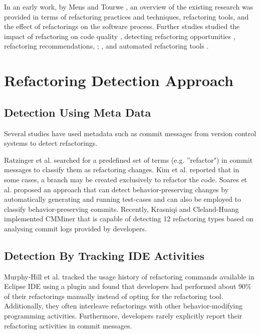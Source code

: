 \documentclass[letterpaper,12pt,onecolumn,final]{report}
\begin{document}
In an early work, by Mens and Tourwe \cite{Mens2004}, an overview of the existing research was provided in terms of refactoring practices and techniques, refactoring tools, and the effect of refactorings on the software process. Further studies studied the impact of refactoring on code quality \cite{Moser2006} \cite{wilking2007empirical} \cite{bavota2015experimental} \cite{cedrim2016does} \cite{pantiuchina2018improving} \cite{alomar2019impact},  detecting refactoring opportunities \cite{fontana2012automatic} \cite{palomba2013detecting}, refactoring recommendations, \cite{mkaouer2015many}; \cite{bavota2014recommending} \cite{ouni2016multi}, and automated refactoring tools \cite{roberts1997refactoring} \cite{mazinanian2016jdeodorant} \cite{Kim2010} \cite{Tsantalis2018} \cite{Silva2020} \cite{Moghadam2021}.

\section{Refactoring Detection Approach}
\subsection{Detection Using Meta Data}
Several studies have used metadata such as commit messages from version control systems to detect refactorings. 

Ratzinger et al. \cite{ratzinger2008relation} searched for a predefined set of terms (e.g. ”refactor") in commit messages to classify them as refactoring changes. Kim et al. \cite{kim2014empirical} reported that in some cases, a branch may be created exclusively to refactor the code. Soares et al. \cite{soares2010making} proposed an approach that can detect behavior-preserving changes by automatically generating and running test-cases and can also be employed to classify behavior-preserving commits. Recently, Krasniqi and Cleland-Huang \cite{Krasniqi2020} implemented CMMiner that is capable of detecting 12 refactoring types based on analysing commit logs provided by developers.

\subsection{Detection By Tracking IDE Activities}
Murphy-Hill et al. \cite{MurphyHill2012} tracked the usage history of refactoring commands available in Eclipse IDE using a plugin and found that developers had performed about 90\% of their refactorings manually instead of opting for the refactoring tool. Additionally, they often interleave refactorings with other behavior-modifying programming activities. Furthermore, developers rarely explicitly report their refactoring activities in commit messages.
\end{document}
